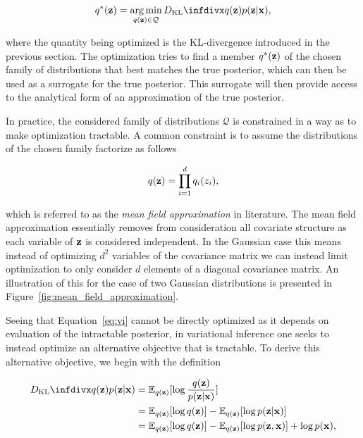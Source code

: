 \begin{equation}
q^{*}(\bz) = \argmin_{q(\bz) \in \mathcal{Q}} \dkl{q(\bz)}{p(\bz \vert \bx)},
\label{eq:vi}
\end{equation}

where the quantity being optimized is the KL-divergence introduced in the previous section. The optimization tries to find a member $q^{*}(\mathbf{z})$ of the chosen family of distributions that best matches the true posterior, which can then be used as a surrogate for the true posterior. This surrogate will then provide access to the analytical form of an approximation of the true posterior.

In practice, the considered family of distributions $\mathcal{Q}$ is constrained in a way as to make optimization tractable. A common constraint is to assume the distributions of the chosen family factorize as follows

$$q(\mathbf{z}) = \prod_{i=1}^{d} q_{i}(z_{i}),$$

which is referred to as the \textit{mean field approximation} in literature. The mean field approximation essentially removes from consideration all covariate structure as each variable of $\mathbf{z}$ is considered independent. In the Gaussian case this means instead of optimizing $d^2$ variables of the covariance matrix we can instead limit optimization to only consider $d$ elements of a diagonal covariance matrix. An illustration of this for the case of two Gaussian distributions is presented in Figure~\ref{fig:mean_field_approximation}.

Seeing that Equation~\ref{eq:vi} cannot be directly optimized as it depends on evaluation of the intractable posterior, in variational inference one seeks to instead optimize an alternative objective that is tractable. To derive this alternative objective, we begin with the definition

\begin{equation}
\begin{aligned}
\dkl{q(\bz)}{p(\bz \vert \bx)} &= \mathbb{E}_{q(\bz)}[\log \frac{q(\bz)}{p(\bz \vert \bx)}] \\
                               &= \mathbb{E}_{q(\bz)}[\log q(\bz)] - \mathbb{E}_{q(\bz)}[\log p(\bz \vert \bx)] \\
                               &= \mathbb{E}_{q(\bz)}[\log q(\bz)] - \mathbb{E}_{q(\bz)}[\log p(\bz, \bx)] + \log p(\bx),
\end{aligned}
\end{equation}

